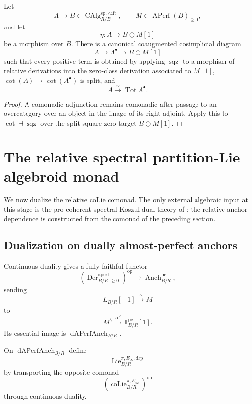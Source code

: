 \begin{corollary}
\label{cor:bnla-spectral-relative-square-zero-resolution}
Let
\[
    A\to B
    \in
    \operatorname{CAlg}^{\mathrm{sp},\wedge\mathrm{aft}}_{R/B},
    \qquad
    M\in\operatorname{APerf}(B)_{\geq0},
\]
and let
\[
    \eta:A\longrightarrow B\oplus M[1]
\]
be a morphism over $B$.  There is a canonical coaugmented cosimplicial diagram
\[
    A\longrightarrow A^\bullet\longrightarrow B\oplus M[1]
\]
such that every positive term is obtained by applying
$\operatorname{sqz}$ to a morphism of relative derivations into the
zero-class derivation associated to $M[1]$,
$\operatorname{cot}(A)\to\operatorname{cot}(A^\bullet)$ is split, and
\[
    A\xrightarrow{\sim}\operatorname*{Tot}A^\bullet.
\]
\end{corollary}

\begin{proof}
A comonadic adjunction remains comonadic after passage to an overcategory over
an object in the image of its right adjoint.  Apply this to
$\operatorname{cot}\dashv\operatorname{sqz}$ over the split square-zero target
$B\oplus M[1]$.
\end{proof}
\section{The relative spectral partition-Lie algebroid monad}
\label{sec:bnla-spectral-lie-algebroid-monad}

We now dualize the relative coLie comonad.  The only external algebraic input
at this stage is the pro-coherent spectral Koszul-dual theory of
\cite{BrantnerCamposNuiten2025}; the relative anchor dependence is constructed
from the comonad of the preceding section.

\subsection{Dualization on dually almost-perfect anchors}

Continuous duality gives a fully faithful functor
\[
    \left(
        \operatorname{Der}^{\mathrm{aperf}}_{B/R,\geq0}
    \right)^{\mathrm{op}}
    \longrightarrow
    \operatorname{Anch}^{\mathrm{pc}}_{B/R},
\]
sending
\[
    L_{B/R}[-1]\xrightarrow{\alpha}M
\]
to
\[
    M^\vee\xrightarrow{\alpha^\vee}
    \mathbb T^{\mathrm{pc}}_{B/R}[1].
\]
Its essential image is
$\operatorname{dAPerfAnch}_{B/R}$.

\begin{definition}
\label{def:bnla-relative-spectral-lie-compact}
On $\operatorname{dAPerfAnch}_{B/R}$ define
\[
    \operatorname{Lie}^{\pi,E_\infty,\mathrm{dap}}_{B/R}
\]
by transporting the opposite comonad
\[
    \left(
        \operatorname{coLie}^{\pi,E_\infty}_{B/R}
    \right)^{\mathrm{op}}
\]
through continuous duality.
\end{definition}

